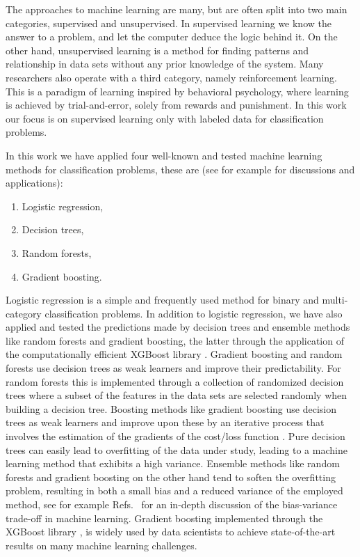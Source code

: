 \documentclass[superscriptaddress,unsortedaddress,
 amsmath,amssymb,
 aps,
]{revtex4-2}
\begin{document}
The approaches to machine learning are many, but are often split into two main categories, supervised and unsupervised. In supervised learning we know the answer to a problem, and let the computer deduce the logic behind it. On the other hand, unsupervised learning is a method for finding patterns and relationship in data sets without any prior knowledge of the system. Many researchers also operate with a third category, namely reinforcement learning. This is a paradigm of learning inspired by behavioral psychology, where learning is achieved by trial-and-error, solely from rewards and punishment. In this work our focus is on supervised learning only with labeled data for classification problems.

In this work we have applied four well-known and tested machine learning methods for classification problems, these are (see for example \cite{Hastie2009,Mehta2019} for discussions and applications):
\begin{enumerate}
    \item Logistic regression,
    \item Decision trees,
    \item Random forests,
    \item Gradient boosting.
\end{enumerate}
Logistic regression \cite{Hastie2009} is a simple and frequently used method for binary and multi-category classification problems.  In addition to logistic regression, we have also applied and tested the predictions made by decision trees and ensemble methods like random forests and gradient boosting, the latter through the application of the computationally efficient  XGBoost library \cite{xgboost2016}. Gradient boosting and random forests use decision trees as weak learners and improve their predictability. For random forests this is implemented through a collection of randomized decision trees where a  subset of the features in the data sets are selected randomly when building a decision tree. Boosting methods like gradient boosting use decision trees as  weak learners and improve upon these by an iterative process that involves the estimation of the gradients of the cost/loss function \cite{Hastie2009}. Pure decision trees can easily lead to overfitting of the data under study, leading to a machine learning method that exhibits a high variance. Ensemble methods like random forests and gradient boosting on the other hand tend to soften the overfitting problem, resulting in both a small bias and a reduced variance of the employed method, see for example Refs.~\cite{Hastie2009,Mehta2019} for an in-depth discussion of the bias-variance trade-off in machine learning. Gradient boosting implemented through the  XGBoost library \cite{xgboost2016}, is widely used by data scientists to achieve state-of-the-art results on many machine learning challenges.
\end{document}
